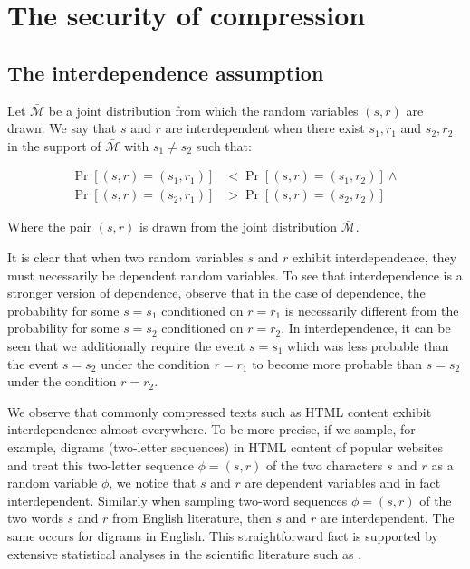 \documentclass[conference, letterpaper, 10pt]{IEEEtran}
\begin{document}
\section{The security of compression}\label{sec:comsec}

\subsection{The interdependence assumption}

Let $\bar{\mathcal{M}}$ be a joint distribution from which the random variables
$(s, r)$ are drawn. We say that $s$ and $r$ are interdependent when there exist
$s_1, r_1$ and $s_2, r_2$ in the support of $\bar{\mathcal{M}}$ with $s_1 \neq
s_2$ such that:

\begin{align*}
    \Pr[(s, r) = (s_1, r_1)] &< \Pr[(s, r) = (s_1, r_2)]
\land\\
    \Pr[(s, r) = (s_2, r_1)] &> \Pr[(s, r) = (s_2, r_2)]
\end{align*}

Where the pair $(s, r)$ is drawn from the joint distribution
$\bar{\mathcal{M}}$.

It is clear that when two random variables $s$ and $r$ exhibit interdependence,
they must necessarily be dependent random variables. To see that
interdependence is a stronger version of dependence, observe that in the case
of dependence, the probability for some $s = s_1$ conditioned on $r = r_1$ is
necessarily different from the probability for some $s = s_2$ conditioned on $r
= r_2$. In interdependence, it can be seen that we additionally require the
event $s = s_1$ which was less probable than the event $s = s_2$ under the
condition $r = r_1$ to become more probable than $s = s_2$ under the condition
$r = r_2$.

We observe that commonly compressed texts such as HTML content exhibit
interdependence almost everywhere. To be more precise, if we sample, for
example, digrams (two-letter sequences) in HTML content of popular websites and
treat this two-letter sequence $\phi = (s, r)$ of the two characters $s$ and
$r$ as a random variable $\phi$, we notice that $s$ and $r$ are dependent
variables and in fact interdependent. Similarly when sampling two-word sequences
$\phi = (s, r)$ of the two words $s$ and $r$ from English literature, then $s$
and $r$ are interdependent. The same occurs for digrams in English. This
straightforward fact is supported by extensive statistical analyses in the
scientific literature such as \cite{c18}.
\end{document}
